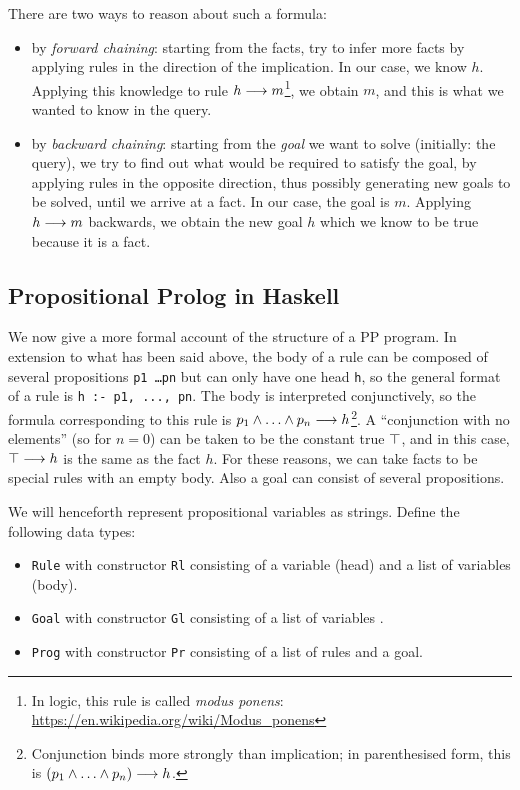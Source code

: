 \documentclass[english]{article}
\begin{document}
There are two ways to reason about such a formula:
\begin{itemize}
\item by \emph{forward chaining}: starting from the facts, try to infer more
  facts by applying rules in the direction of the implication. In our case, we
  know $h$. Applying this knowledge to rule $h \longrightarrow m$\footnote{In logic,
    this rule is called \emph{modus ponens}:
    \url{https://en.wikipedia.org/wiki/Modus_ponens}}, we obtain $m$, and this
  is what we wanted to know in the query.
\item by \emph{backward chaining}: starting from the \emph{goal} we want to
  solve (initially: the query), we try to find out what would be required to
  satisfy the goal, by applying rules in the opposite direction, thus possibly
  generating new goals to be solved, until we arrive at a fact. In our case,
  the goal is $m$. Applying $h \longrightarrow m$ backwards, we obtain the new goal $h$
  which we know to be true because it is a fact.
\end{itemize}


\subsection{Propositional Prolog in Haskell}\label{sec:prolog_in_haskell}

We now give a more formal account of the structure of a PP program. In
extension to what has been said above, the body of a rule can be composed of
several propositions \texttt{p1 \dots pn} but can only have one head
\texttt{h}, so the general format of a rule is \texttt{h :- p1, ..., pn}. The
body is interpreted conjunctively, so the formula corresponding to this rule
is $p_1 \AND \dots \AND p_n \IMPL h$\footnote{Conjunction binds more strongly
  than implication; in parenthesised form, this is $(p_1 \AND \dots \AND p_n) \IMPL h$.}.
A ``conjunction with no elements'' (so for $n=0$) can be taken to be the
constant true $\top$, and in this case, $\top \longrightarrow h$ is the same as the
fact $h$. For these reasons, we can take facts to be special rules with an
empty body.  Also a goal can consist of several propositions.

\begin{exo}\label{exo:pp_prog_structure}
  We will henceforth represent propositional variables as strings.
  Define the following data types:
  \begin{itemize}
  \item \texttt{Rule} with constructor \texttt{Rl} consisting of a variable
    (head) and a list of variables (body).    
  \item \texttt{Goal} with constructor \texttt{Gl} consisting of a list of
    variables .
  \item \texttt{Prog} with constructor \texttt{Pr} consisting of a list of
    rules and a goal.
  \end{itemize}
\end{exo}
\end{document}

